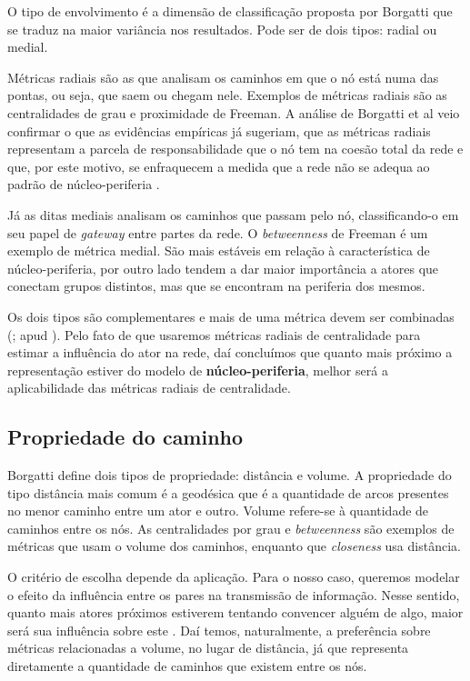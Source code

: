 O tipo de envolvimento é a dimensão de classificação proposta por Borgatti que
se traduz na maior variância nos resultados. Pode ser de dois tipos: radial ou
medial.

Métricas radiais são as que analisam os caminhos em que o nó está numa das
pontas, ou seja, que saem ou chegam nele. Exemplos de métricas radiais são as
centralidades de grau e proximidade de Freeman. A análise de Borgatti et al veio
confirmar o que as evidências empíricas já sugeriam, que as métricas radiais
representam a parcela de responsabilidade que o nó tem na coesão total da rede e
que, por este motivo, se enfraquecem a medida que a rede não se adequa ao padrão
de núcleo-periferia \citep{Nakao1990}.

Já as ditas mediais analisam os caminhos que passam pelo nó, classificando-o em
seu papel de \emph{gateway} entre partes da rede. O \emph{betweenness} de
Freeman é um exemplo de métrica medial. São mais estáveis em relação à
característica de núcleo-periferia, por outro lado tendem a dar maior importância
a atores que conectam grupos distintos, mas que se encontram na periferia dos
mesmos.

Os dois tipos são complementares e mais de uma métrica devem ser combinadas
(\citealt{Stephenson1989}; apud \citealt{Wasserman}). Pelo fato de que usaremos
métricas radiais de centralidade para estimar a influência do ator na rede, daí
concluímos que quanto mais próximo a representação estiver do modelo de
\textbf{núcleo-periferia}, melhor será a aplicabilidade das métricas radiais de
centralidade.

\subsection{Propriedade do caminho}

Borgatti define dois tipos de propriedade: distância e volume. A
propriedade do tipo distância mais comum é a geodésica que é a quantidade de
arcos presentes no menor caminho entre um ator e outro. Volume refere-se à
quantidade de caminhos entre os nós. As centralidades por grau e
\emph{betweenness} são exemplos de métricas que usam o volume dos caminhos,
enquanto que \emph{closeness} usa distância.

O critério de escolha depende da aplicação. Para o nosso caso, queremos modelar o
efeito da influência entre os pares na transmissão de informação. Nesse sentido,
quanto mais atores próximos estiverem tentando convencer alguém de algo, maior
será sua influência sobre este \citep{Watts2007}. Daí temos, naturalmente, a
preferência sobre métricas relacionadas a volume, no lugar de distância, já que
representa diretamente a quantidade de caminhos que existem entre os nós.

